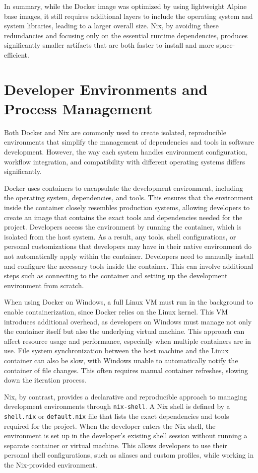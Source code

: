 In summary, while the Docker image was optimized by using lightweight Alpine base images,
it still requires additional layers to include the operating system and system libraries,
leading to a larger overall size. Nix, by avoiding these redundancies and focusing only on
the essential runtime dependencies, produces significantly smaller artifacts that are both
faster to install and more space-efficient.

\section{Developer Environments and Process Management}
Both Docker and Nix are commonly used to create isolated, reproducible environments that
simplify the management of dependencies and tools in software development. However, the
way each system handles environment configuration, workflow integration, and compatibility
with different operating systems differs significantly.

Docker uses containers to encapsulate the development environment, including the operating
system, dependencies, and tools. This ensures that the environment inside the container
closely resembles production systems, allowing developers to create an image that contains
the exact tools and dependencies needed for the project. Developers access the environment
by running the container, which is isolated from the host system. As a result, any tools,
shell configurations, or personal customizations that developers may have in their native
environment do not automatically apply within the container. Developers need to manually
install and configure the necessary tools inside the container. This can involve additional
steps such as connecting to the container and setting up the development environment from
scratch.

When using Docker on Windows, a full Linux VM
must run in the background to enable containerization, since Docker relies on the Linux kernel.
This VM introduces additional overhead,
as developers on Windows must manage not only the container itself
but also the underlying virtual machine. This approach can affect resource usage and
performance, especially when multiple containers are in use. File system synchronization
between the host machine and the Linux container can also be slow, with Windows unable
to automatically notify the container of file changes. This often requires manual container
refreshes, slowing down the iteration process.

Nix, by contrast, provides a declarative and reproducible approach to managing development
environments through \texttt{nix-shell}. A Nix shell is defined by a \texttt{shell.nix}
or \texttt{default.nix} file that lists the exact dependencies and tools required for the
project. When the developer enters the Nix shell, the environment is set up in the
developer’s existing shell session without running a separate container or virtual machine.
This allows developers to use their personal shell configurations, such as aliases and
custom profiles, while working in the Nix-provided environment.

